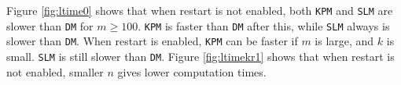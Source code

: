 \noindent Figure \ref{fig:ltime0} shows that when restart is not enabled, both \texttt{KPM} and \texttt{SLM} are slower than \texttt{DM} for $m \geq 100$. \texttt{KPM} is faster than \texttt{DM} after this, while \texttt{SLM} always is slower than \texttt{DM}. 
When restart is enabled, \texttt{KPM} can be faster if $m$ is large, and $k$ is small. \texttt{SLM} is still slower than \texttt{DM}.
Figure \ref{fig:ltimekr1} shows that when restart is not enabled, smaller $n$ gives lower computation times.  